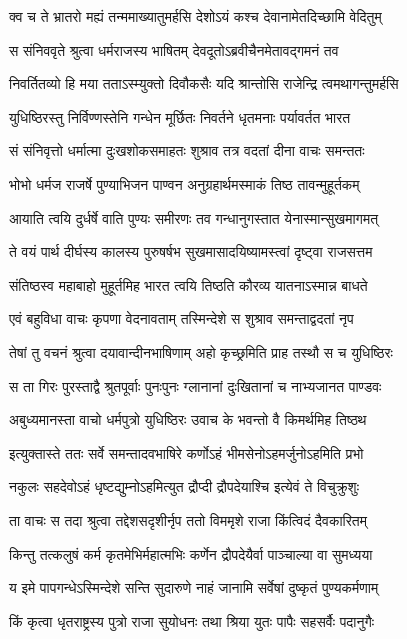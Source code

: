\twolineshloka
{क्व च ते भ्रातरो मह्यं तन्ममाख्यातुमर्हसि}
{देशोऽयं कश्च देवानामेतदिच्छामि वेदितुम्}


\twolineshloka
{स संनिववृते श्रुत्वा धर्मराजस्य भाषितम्}
{देवदूतोऽब्रवीचैनमेतावद्गमनं तव}


\twolineshloka
{निवर्तितव्यो हि मया तताऽस्म्युक्तो दिवौकसैः}
{यदि श्रान्तोसि राजेन्द्रि त्वमथागन्तुमर्हसि}


\twolineshloka
{युधिष्ठिरस्तु निर्विण्णस्तेनि गन्धेन मूर्छितः}
{निवर्तने धृतमनाः पर्यावर्तत भारत}


\twolineshloka
{सं संनिवृत्तो धर्मात्मा दुःखशोकसमाहतः}
{शुश्राव तत्र वदतां दीना वाचः समन्ततः}


\twolineshloka
{भोभो धर्मज राजर्षे पुण्याभिजन पाण्वन}
{अनुग्रहार्थमस्माकं तिष्ठ तावन्मुहूर्तकम्}


\twolineshloka
{आयाति त्वयि दुर्धर्षे वाति पुण्यः समीरणः}
{तव गन्धानुगस्तात येनास्मान्सुखमागमत्}


\twolineshloka
{ते वयं पार्थ दीर्घस्य कालस्य पुरुषर्षभ}
{सुखमासादयिष्यामस्त्वां दृष्ट्वा राजसत्तम}


\twolineshloka
{संतिष्ठस्व महाबाहो मुहूर्तमिह भारत}
{त्वयि तिष्ठति कौरव्य यातनाऽस्मान्न बाधते}


\twolineshloka
{एवं बहुविधा वाचः कृपणा वेदनावताम्}
{तस्मिन्देशे स शुश्राव समन्ताद्वदतां नृप}


\twolineshloka
{तेषां तु वचनं श्रुत्वा दयावान्दीनभाषिणाम्}
{अहो कृच्छ्रमिति प्राह तस्थौ स च युधिष्ठिरः}


\twolineshloka
{स ता गिरः पुरस्ताद्वै श्रुतपूर्वाः पुनःपुनः}
{ग्लानानां दुःखितानां च नाभ्यजानत पाण्डवः}


\twolineshloka
{अबुध्यमानस्ता वाचो धर्मपुत्रो युधिष्ठिरः}
{उवाच के भवन्तो वै किमर्थमिह तिष्ठथ}


\twolineshloka
{इत्युक्तास्ते ततः सर्वे समन्तादवभाषिरे}
{कर्णोऽहं भीमसेनोऽहमर्जुनोऽहमिति प्रभो}


\twolineshloka
{नकुलः सहदेवोऽहं धृष्टद्युम्नोऽहमित्युत}
{द्रौप्दी द्रौपदेयाश्चि इत्येवं ते विचुक्रुशुः}


\twolineshloka
{ता वाचः स तदा श्रुत्वा तद्देशसदृशीर्नृप}
{ततो विममृशे राजा किंत्विदं दैवकारितम्}


\twolineshloka
{किन्तु तत्कलुषं कर्म कृतमेभिर्महात्मभिः}
{कर्णेन द्रौपदेयैर्वा पाञ्चाल्या वा सुमध्यया}


\twolineshloka
{य इमे पापगन्धेऽस्मिन्देशे सन्ति सुदारुणे}
{नाहं जानामि सर्वेषां दुष्कृतं पुण्यकर्मणाम्}


\twolineshloka
{किं कृत्वा धृतराष्ट्रस्य पुत्रो राजा सुयोधनः}
{तथा श्रिया युतः पापैः सहसर्वैः पदानुगैः}


